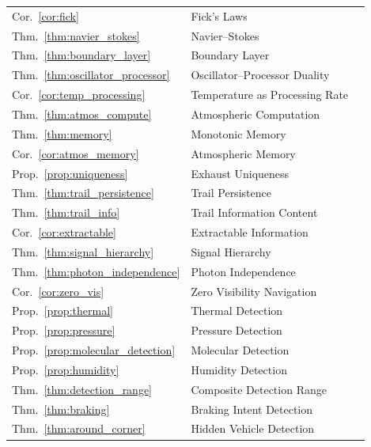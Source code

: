 \documentclass[11pt,twocolumn,a4paper]{article}
\theoremstyle{plain}
\theoremstyle{definition}
\theoremstyle{remark}
\begin{document}
\begin{longtable}{lll}
Cor.~\ref{cor:fick} & Fick's Laws & \pageref{cor:fick} \\
Thm.~\ref{thm:navier_stokes} & Navier--Stokes & \pageref{thm:navier_stokes} \\
Thm.~\ref{thm:boundary_layer} & Boundary Layer & \pageref{thm:boundary_layer} \\
Thm.~\ref{thm:oscillator_processor} & Oscillator--Processor Duality & \pageref{thm:oscillator_processor} \\
Cor.~\ref{cor:temp_processing} & Temperature as Processing Rate & \pageref{cor:temp_processing} \\
Thm.~\ref{thm:atmos_compute} & Atmospheric Computation & \pageref{thm:atmos_compute} \\
Thm.~\ref{thm:memory} & Monotonic Memory & \pageref{thm:memory} \\
Cor.~\ref{cor:atmos_memory} & Atmospheric Memory & \pageref{cor:atmos_memory} \\
Prop.~\ref{prop:uniqueness} & Exhaust Uniqueness & \pageref{prop:uniqueness} \\
Thm.~\ref{thm:trail_persistence} & Trail Persistence & \pageref{thm:trail_persistence} \\
Thm.~\ref{thm:trail_info} & Trail Information Content & \pageref{thm:trail_info} \\
Cor.~\ref{cor:extractable} & Extractable Information & \pageref{cor:extractable} \\
Thm.~\ref{thm:signal_hierarchy} & Signal Hierarchy & \pageref{thm:signal_hierarchy} \\
Thm.~\ref{thm:photon_independence} & Photon Independence & \pageref{thm:photon_independence} \\
Cor.~\ref{cor:zero_vis} & Zero Visibility Navigation & \pageref{cor:zero_vis} \\
Prop.~\ref{prop:thermal} & Thermal Detection & \pageref{prop:thermal} \\
Prop.~\ref{prop:pressure} & Pressure Detection & \pageref{prop:pressure} \\
Prop.~\ref{prop:molecular_detection} & Molecular Detection & \pageref{prop:molecular_detection} \\
Prop.~\ref{prop:humidity} & Humidity Detection & \pageref{prop:humidity} \\
Thm.~\ref{thm:detection_range} & Composite Detection Range & \pageref{thm:detection_range} \\
Thm.~\ref{thm:braking} & Braking Intent Detection & \pageref{thm:braking} \\
Thm.~\ref{thm:around_corner} & Hidden Vehicle Detection & \pageref{thm:around_corner} \\

\end{longtable}
\end{document}
